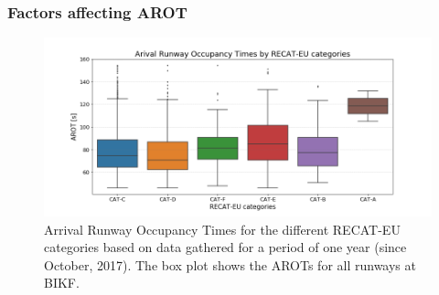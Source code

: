 \subsubsection{Factors affecting AROT\label{sssec:factors_arot}}


\begin{figure}[h]
    \centering
    \includegraphics[width=1\textwidth]{graphics/fig_RECAT_AROTs_boxplot.png}
    \caption[AROTs boxplot for RECAT categories, all runways]{Arrival Runway Occupancy Times for the different RECAT-EU categories based on data gathered for a period of one year (since October, 2017). The box plot shows the AROTs for all runways at BIKF.}
    \label{fig:RECAT_AROTs_boxplot}
\end{figure}


\begin{table}[h]
\centering
{}
\caption[AROTs for the air traffic mix by RECAT]{AROT statistics for the air traffic mix at KEF by RECAT-EU categories. The count is the number of landings in peak hours since October 2017}
\label{tab:AROT_RECAT_stats}
\end{table}


